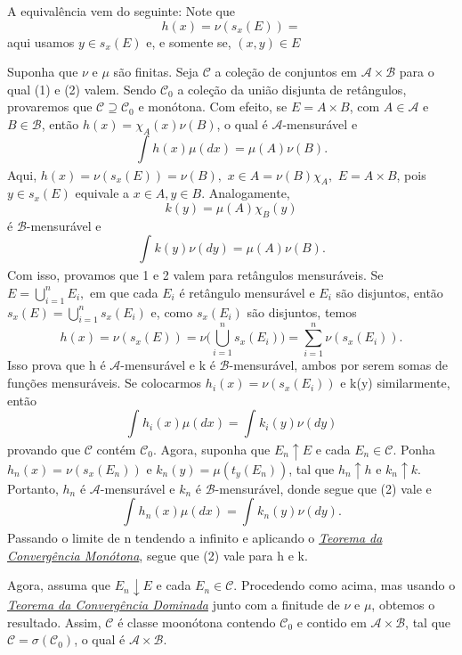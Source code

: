 \documentclass[measure_theory.tex]{subfiles}
\begin{document}
\begin{proof*}
	A equivalência vem do seguinte: Note que
	\[
		h(x) = \nu(s_x(E)) =
	\]
	aqui usamos \(y\in s_x(E)\) e, e somente se, \((x, y)\in E\)

	Suponha que \(\nu\) e \(\mu \) são finitas. Seja \(\mathcal{C}\) a coleção de conjuntos em \(\mathcal{A}\times \mathcal{B}\) para o qual (1)
	e (2) valem. Sendo \(\mathcal{C}_{0}\) a coleção da união disjunta de retângulos, provaremos que \(\mathcal{C}\supseteq \mathcal{C}_{0}\) e monótona.
	Com efeito, se \(E = A\times B\), com \(A\in \mathcal{A}\) e \(B\in \mathcal{B}\), então \(h(x) = \chi_{A}(x)\nu(B)\), o qual é \(\mathcal{A}\)-mensurável e
	\[
		\int_{}h(x) \mu (dx) = \mu (A)\nu(B).
	\]
	Aqui, \(h(x) = \nu(s_x(E)) = \nu(B),\) \(x\in A = \nu(B)\chi_{A},\) \(E = A\times B\), pois \(y\in s_x(E) \) equivale a \(x\in  A, y\in B\). Analogamente,
	\[
		k(y) = \mu (A)\chi_{B}(y)
	\]
	é \(\mathcal{B}\)-mensurável e
	\[
		\int_{}k(y)\nu( dy) = \mu (A)\nu(B).
	\]
	Com isso, provamos que 1 e 2 valem para retângulos mensuráveis. Se \(E = \bigcup_{i=1}^{n}E_{i},\) em que cada \(E_{i}\) é retângulo mensurável e \(E_{i}\) são disjuntos, então \(s_x(E) = \bigcup_{i=1}^{n}s_x(E_{i})\)
	e, como \(s_x(E_{i})\) são disjuntos, temos
	\[
		h(x) = \nu(s_x(E)) = \nu \biggl(\bigcup_{i=1}^{n}s_x(E_{i})\biggr) = \sum\limits_{i=1}^{n}\nu(s_x(E_{i})).
	\]
	Isso prova que h é \(\mathcal{A}\)-mensurável e k é \(\mathcal{B}\)-mensurável, ambos por serem somas de funções mensuráveis. Se colocarmos \(h_{i}(x) = \nu(s_x(E_{i}))\) e k(y) similarmente, então
	\[
		\int_{}h_{i}(x)\mu ( dx) = \int_{}k_{i}(y)\nu( dy)
	\]
	provando que \(\mathcal{C}\) contém \(\mathcal{C}_{0}\). Agora, suponha que \(E_{n}\uparrow E\) e cada \(E_{n}\in \mathcal{C}\). Ponha \(h_{n}(x) = \nu(s_x(E_{n}))\) e \(k_{n}(y) = \mu (t_y(E_{n}))\), tal que
	\(h_{n}\uparrow h\) e \(k_{n}\uparrow k\). Portanto, \(h_{n}\) é \(\mathcal{A}\)-mensurável e \(k_{n}\) é \(\mathcal{B}\)-mensurável, donde segue que (2) vale e
	\[
		\int_{}h_{n}(x)\mu ( dx) = \int_{}k_{n}(y)\nu( dy).
	\]
	Passando o limite de n tendendo a infinito e aplicando o \hyperlink{monotone_convergence}{\textit{Teorema da Convergência Monótona}}, segue que (2) vale para h e k.

	Agora, assuma que \(E_{n}\downarrow E\) e cada \(E_{n}\in \mathcal{C}.\) Procedendo como acima, mas usando o \hyperlink{dominated_convergence}{\textit{Teorema da Convergência Dominada}} junto com a finitude de \(\nu\) e \(\mu \), obtemos o resultado.
	Assim, \(\mathcal{C}\) é classe moonótona contendo \(\mathcal{C}_{0}\) e contido em \(\mathcal{A}\times \mathcal{B}\), tal que \(\mathcal{C} = \sigma (\mathcal{C}_{0})\), o qual é \(\mathcal{A}\times \mathcal{B}.\)


\end{proof*}
\end{document}
